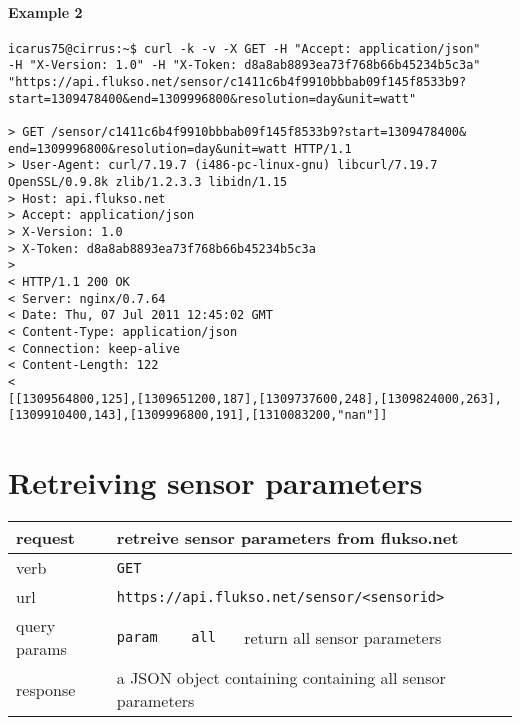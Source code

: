 \paragraph{Example 2}
\begin{Verbatim}
icarus75@cirrus:~$ curl -k -v -X GET -H "Accept: application/json"
-H "X-Version: 1.0" -H "X-Token: d8a8ab8893ea73f768b66b45234b5c3a"
"https://api.flukso.net/sensor/c1411c6b4f9910bbbab09f145f8533b9?
start=1309478400&end=1309996800&resolution=day&unit=watt"

> GET /sensor/c1411c6b4f9910bbbab09f145f8533b9?start=1309478400&
end=1309996800&resolution=day&unit=watt HTTP/1.1
> User-Agent: curl/7.19.7 (i486-pc-linux-gnu) libcurl/7.19.7
OpenSSL/0.9.8k zlib/1.2.3.3 libidn/1.15
> Host: api.flukso.net
> Accept: application/json
> X-Version: 1.0
> X-Token: d8a8ab8893ea73f768b66b45234b5c3a
> 
< HTTP/1.1 200 OK
< Server: nginx/0.7.64
< Date: Thu, 07 Jul 2011 12:45:02 GMT
< Content-Type: application/json
< Connection: keep-alive
< Content-Length: 122
< 
[[1309564800,125],[1309651200,187],[1309737600,248],[1309824000,263],
[1309910400,143],[1309996800,191],[1310083200,"nan"]]
\end{Verbatim}

\section{Retreiving sensor parameters}
\begin{tabular}{|l|l|l|p{5cm}|}

\hline
request & \multicolumn{3}{|l|}{retreive sensor parameters from flukso.net} \\

\hline
verb & \multicolumn{3}{|l|}{\texttt{GET}} \\

\hline
url & \multicolumn{3}{|l|}{\texttt{https://api.flukso.net/sensor/\textless sensorid\textgreater}} \\

\hline
{query params} & \texttt{param} & \texttt{all} & return all sensor parameters \\

\hline
response & \multicolumn{3}{|l|}{a JSON object containing containing all sensor parameters} \\

\hline

\end{tabular}

